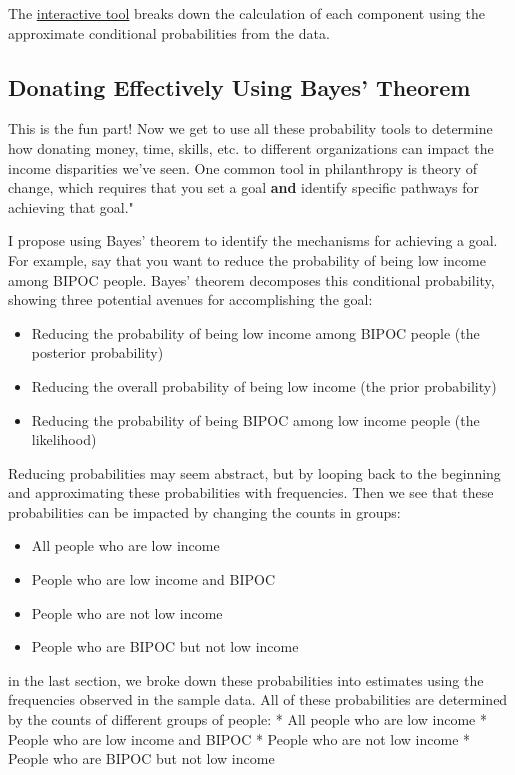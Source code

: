 \documentclass[11pt]{article}
\begin{document}
The \href{https://observablehq.com/d/b1dfcf5fca53a8b2#cell-373}{interactive tool} breaks down the calculation of each component using the approximate conditional probabilities from the data.

\subsection*{Donating Effectively Using Bayes' Theorem}

This is the fun part! Now we get to use all these probability tools to determine how donating money, time, skills, etc. to different organizations can impact the income disparities we've seen. One common tool in philanthropy is theory of change, which requires that you set a goal \textbf{and} identify specific pathways for achieving that goal."\cite{effphil}\cite{theorychange} 

I propose using Bayes' theorem to identify the mechanisms for achieving a goal. For example, say that you want to reduce the probability of being low income among BIPOC people. Bayes' theorem decomposes this conditional probability, showing three potential avenues for accomplishing the goal:
\begin{itemize}
    \item Reducing the probability of being low income among BIPOC people (the posterior probability)
    \item Reducing the overall probability of being low income (the prior probability)
    \item Reducing the probability of being BIPOC among low income people (the likelihood)
\end{itemize}

Reducing probabilities may seem abstract, but by looping back to the beginning and approximating these probabilities with frequencies. Then we see that these probabilities can be impacted by changing the counts in groups:
\begin{itemize}
    \item All people who are low income
    \item People who are low income and BIPOC
    \item People who are not low income
    \item People who are BIPOC but not low income
\end{itemize}
in the last section, we broke down these probabilities into estimates using the frequencies observed in the sample data. All of these probabilities are determined by the counts of different groups of people:
* All people who are low income
* People who are low income and BIPOC
* People who are not low income
* People who are BIPOC but not low income
\end{document}
